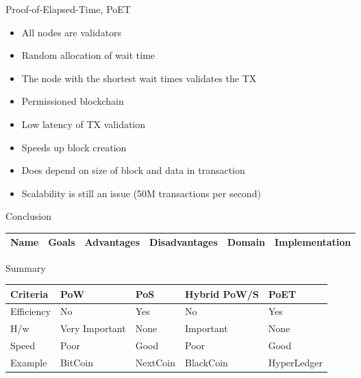 \documentclass[pdf,table]{beamer}
\begin{document}
\begin{frame}{Proof-of-Elapsed-Time, PoET}
	\begin{itemize}
		\item All nodes are validators
		\item Random allocation of wait time
		\item The node with the shortest wait times validates the TX
		\item Permissioned blockchain
		\item Low latency of TX validation
		\item Speeds up block creation \cite{thakkar2018performance}
		\item Does depend on size of block and data in transaction
		\item Scalability is still an issue (50M transactions per second)
	\end{itemize}
\end{frame}



\begin{frame}{Conclusion}
	\begin{tabular}{|l|p{20mm}|p{20mm}|p{20mm}|p{20mm}|p{20mm}|}\hline
		Name & Goals & Advantages & Disadvantages & Domain & Implementation \\ \hline \hline
	\end{tabular}
\end{frame}




\begin{frame}{Summary}
	\begin{table}
		\begin{tabular}{lllll}
			Criteria & PoW & PoS & Hybrid PoW/S & PoET \\ \hline
			Efficiency & No	& Yes& No & Yes \\
			H/w	 & Very Important & None & Important & None \\ 
			Speed	 & Poor & Good & Poor & Good \\ 
			Example & BitCoin & NextCoin & BlackCoin & HyperLedger \\
		\end{tabular}
	\end{table}
\end{frame}



%
%
\end{document}
